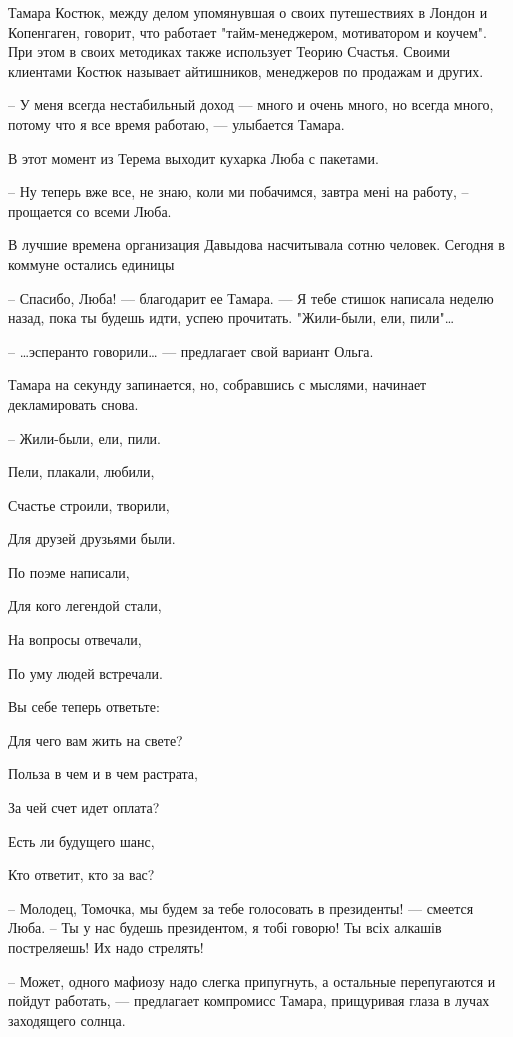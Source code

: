 Тамара Костюк, между делом упомянувшая о своих путешествиях в Лондон и
Копенгаген, говорит, что работает "тайм-менеджером, мотиватором и коучем". При
этом в своих методиках также использует Теорию Счастья. Своими клиентами Костюк
называет айтишников, менеджеров по продажам и других.

– У меня всегда нестабильный доход --- много и очень много, но всегда много,
потому что я все время работаю, --- улыбается Тамара.

В этот момент из Терема выходит кухарка Люба с пакетами.

– Ну теперь вже все, не знаю, коли ми побачимся, завтра мені на работу, –
прощается со всеми Люба.



В лучшие времена организация Давыдова насчитывала сотню человек. Сегодня в коммуне остались единицы

– Спасибо, Люба! --- благодарит ее Тамара. --- Я тебе стишок написала неделю назад, пока ты будешь идти, успею прочитать. "Жили-были, ели, пили"…

– …эсперанто говорили… --- предлагает свой вариант Ольга.

Тамара на секунду запинается, но, собравшись с мыслями, начинает декламировать снова.

– Жили-были, ели, пили.

Пели, плакали, любили,

Счастье строили, творили,

Для друзей друзьями были.

По поэме написали,

Для кого легендой стали,

На вопросы отвечали,

По уму людей встречали.

Вы себе теперь ответьте:

Для чего вам жить на свете?

Польза в чем и в чем растрата,

За чей счет идет оплата?

Есть ли будущего шанс,

Кто ответит, кто за вас?

– Молодец, Томочка, мы будем за тебе голосовать в президенты! --- смеется Люба. –
Ты у нас будешь президентом, я тобі говорю! Ты всіх алкашів постреляешь! Их
надо стрелять!

– Может, одного мафиозу надо слегка припугнуть, а остальные перепугаются и
пойдут работать, --- предлагает компромисс Тамара, прищуривая глаза в лучах
заходящего солнца.

